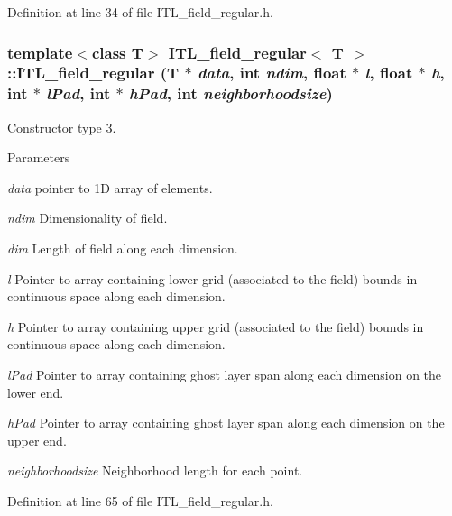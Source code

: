 Definition at line 34 of file ITL\_\-field\_\-regular.h.

\hypertarget{classITL__field__regular_ab01f00953429120f8e31152c69852163}{
\subsubsection[{ITL\_\-field\_\-regular}]{\setlength{\rightskip}{0pt plus 5cm}template$<$class T$>$ {\bf ITL\_\-field\_\-regular}$<$ T $>$::{\bf ITL\_\-field\_\-regular} (T $\ast$ {\em data}, \/  int {\em ndim}, \/  float $\ast$ {\em l}, \/  float $\ast$ {\em h}, \/  int $\ast$ {\em lPad}, \/  int $\ast$ {\em hPad}, \/  int {\em neighborhoodsize})}}
\label{classITL__field__regular_ab01f00953429120f8e31152c69852163}


Constructor type 3. 


\begin{DoxyParams}{Parameters}
\item[{\em data}]pointer to 1D array of elements. \item[{\em ndim}]Dimensionality of field. \item[{\em dim}]Length of field along each dimension. \item[{\em l}]Pointer to array containing lower grid (associated to the field) bounds in continuous space along each dimension. \item[{\em h}]Pointer to array containing upper grid (associated to the field) bounds in continuous space along each dimension. \item[{\em lPad}]Pointer to array containing ghost layer span along each dimension on the lower end. \item[{\em hPad}]Pointer to array containing ghost layer span along each dimension on the upper end. \item[{\em neighborhoodsize}]Neighborhood length for each point. \end{DoxyParams}


Definition at line 65 of file ITL\_\-field\_\-regular.h.


